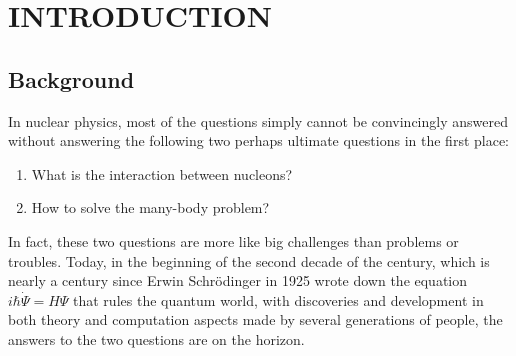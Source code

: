 \documentclass[12pt,letterpaper,UTF8]{report}
\begin{document}
\newpage
{}
\renewcommand{\cftlabel}{Table}
\listoftables
\newpage
{}
{}
\renewcommand{\cftlabel}{Figure}
\listoffigures
\newpage
{}
\renewcommand{\cftlabel}{CHAPTER}

\pagestyle{fancyplain}
\doublespace
{}
\cleardoublepage

\chapter{INTRODUCTION} \hypertarget{chapterhyper}{}

\section{Background}
\label{secBackground}

In nuclear physics, most of the questions simply cannot be convincingly answered without answering the following two perhaps ultimate questions in the first place:
\begin{enumerate}
  \item What is the interaction between nucleons?
  \item How to solve the many-body problem?
\end{enumerate}

In fact, these two questions are more like big challenges than problems or troubles.
Today, in the beginning of the second decade of the  century, which is nearly a century since Erwin Schr\"{o}dinger in 1925 wrote down the equation
$i \hbar \dot{\Psi} = H \Psi$
that rules the quantum world, with discoveries and development in both theory and computation aspects made by several generations of people, the answers to the two questions are on the horizon.
\end{document}
